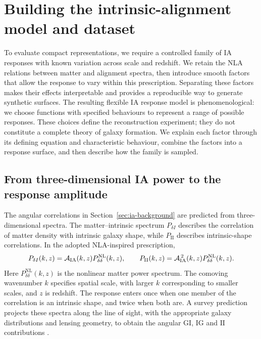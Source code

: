 \section{Building the intrinsic-alignment model and dataset}
\label{sec:model}

To evaluate compact representations, we require a controlled family of IA
responses with known variation across scale and redshift. We retain the NLA
relations between matter and alignment spectra, then introduce smooth
factors that allow the response to vary within this prescription. Separating
these factors makes their effects interpretable and provides a reproducible
way to generate synthetic surfaces. The resulting flexible IA response
model is phenomenological: we choose functions with specified behaviours
to represent a range of possible responses. These choices define the
reconstruction experiment; they do not constitute a complete theory of
galaxy formation. We explain each factor through its defining equation
and characteristic behaviour, combine the factors into a response surface,
and then describe how the family is sampled.

\subsection{From three-dimensional IA power to the response amplitude}
\label{sec:ia-amplitude}

The angular correlations in Section~\ref{sec:ia-background} are predicted
from three-dimensional spectra. The matter--intrinsic spectrum
$P_{\delta I}$ describes the correlation of matter density with intrinsic
galaxy shape, while $P_{\mathrm{II}}$ describes intrinsic-shape correlations.
In the adopted NLA-inspired prescription,
\begin{equation}
  P_{\delta I}(k,z)=\mathcal A_{\rm IA}(k,z)P_{\delta\delta}^{\mathrm{NL}}(k,z),
  \qquad
  P_{\mathrm{II}}(k,z)=\mathcal A_{\rm IA}^{\,2}(k,z)P_{\delta\delta}^{\mathrm{NL}}(k,z).
  \label{eq:nla-power-spectra}
\end{equation}
Here $P_{\delta\delta}^{\mathrm{NL}}(k,z)$ is the nonlinear matter power spectrum.
The comoving wavenumber $k$ specifies spatial scale, with larger $k$
corresponding to smaller scales, and $z$ is redshift.
The response enters once when one member of the correlation is an
intrinsic shape, and twice when both are. A survey prediction projects
these spectra along the line of sight, with the appropriate galaxy
distributions and lensing geometry, to obtain the angular $\mathrm{GI}$,
$\mathrm{IG}$ and $\mathrm{II}$ contributions
\citep{2007NJPh....9..444B}.

